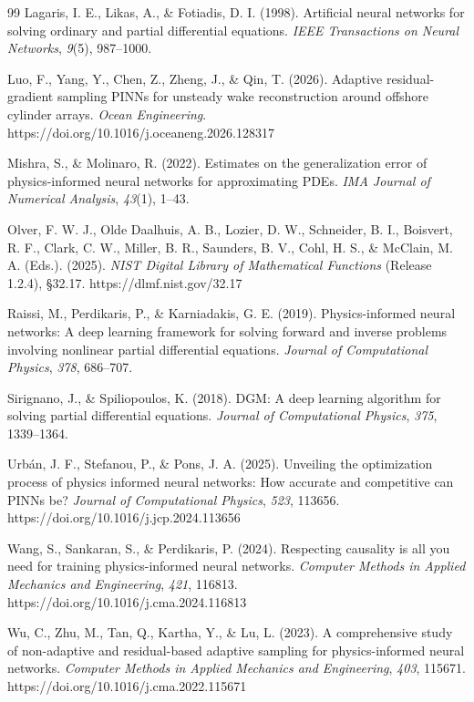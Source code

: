\documentclass[a4paper, 10pt]{article}
\theoremstyle{definition}
\begin{document}
\begin{thebibliography}{99}
Lagaris, I. E., Likas, A., \& Fotiadis, D. I. (1998). Artificial neural networks for solving ordinary and partial differential equations. \emph{IEEE Transactions on Neural Networks}, \emph{9}(5), 987--1000.

Luo, F., Yang, Y., Chen, Z., Zheng, J., \& Qin, T. (2026). Adaptive residual-gradient sampling {PINNs} for unsteady wake reconstruction around offshore cylinder arrays. \emph{Ocean Engineering}. https://doi.org/10.1016/j.oceaneng.2026.128317

Mishra, S., \& Molinaro, R. (2022). Estimates on the generalization error of physics-informed neural networks for approximating {PDEs}. \emph{IMA Journal of Numerical Analysis}, \emph{43}(1), 1--43.

Olver, F. W. J., Olde Daalhuis, A. B., Lozier, D. W., Schneider, B. I., Boisvert, R. F., Clark, C. W., Miller, B. R., Saunders, B. V., Cohl, H. S., \& McClain, M. A. (Eds.). (2025). \emph{{NIST} Digital Library of Mathematical Functions} (Release 1.2.4), \S 32.17. https://dlmf.nist.gov/32.17

Raissi, M., Perdikaris, P., \& Karniadakis, G. E. (2019). Physics-informed neural networks: A deep learning framework for solving forward and inverse problems involving nonlinear partial differential equations. \emph{Journal of Computational Physics}, \emph{378}, 686--707.

Sirignano, J., \& Spiliopoulos, K. (2018). {DGM}: A deep learning algorithm for solving partial differential equations. \emph{Journal of Computational Physics}, \emph{375}, 1339--1364.

Urb\'an, J. F., Stefanou, P., \& Pons, J. A. (2025). Unveiling the optimization process of physics informed neural networks: How accurate and competitive can {PINNs} be? \emph{Journal of Computational Physics}, \emph{523}, 113656. https://doi.org/10.1016/j.jcp.2024.113656

Wang, S., Sankaran, S., \& Perdikaris, P. (2024). Respecting causality is all you need for training physics-informed neural networks. \emph{Computer Methods in Applied Mechanics and Engineering}, \emph{421}, 116813. https://doi.org/10.1016/j.cma.2024.116813

Wu, C., Zhu, M., Tan, Q., Kartha, Y., \& Lu, L. (2023). A comprehensive study of non-adaptive and residual-based adaptive sampling for physics-informed neural networks. \emph{Computer Methods in Applied Mechanics and Engineering}, \emph{403}, 115671. https://doi.org/10.1016/j.cma.2022.115671

\end{thebibliography}
\end{document}
